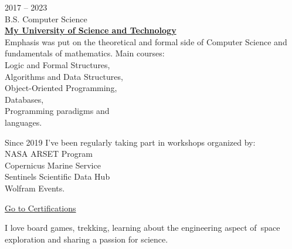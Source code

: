 
{\small 2017 -- 2023\\
B.S. Computer Science\\
{\textbf{{\href{https://www.google.com/}{My University of Science and Technology}}}}}\\
Emphasis was put on the theoretical and formal side of Computer Science and fundamentals of mathematics. Main courses:\\
\task Logic and Formal Structures,\\
\task Algorithms and Data Structures,\\
\task Object-Oriented Programming,\\ \task Databases,\\
\task Programming paradigms and\\ languages.

\vspace{8pt}

Since 2019 I've been regularly taking part in workshops
organized by:\\
\task NASA ARSET Program\\
\task Copernicus Marine Service\\
\task Sentinels Scientific Data Hub\\
\task Wolfram Events.

\hfill \href{https://www.google.com/}{\ssmall Go to Certifications \faLink}


I love board games, trekking, learning about the engineering aspect of~space exploration and sharing a passion for science.